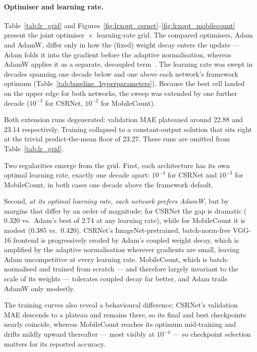 \documentclass[conference]{IEEEtran}
\begin{document}
\paragraph{Optimiser and learning rate.}
Table~\ref{tab:lr_grid} and
Figures~\ref{fig:lrxopt_csrnet}--\ref{fig:lrxopt_mobilecount} present
the joint optimiser~$\times$~learning-rate grid.
The compared optimisers, Adam and AdamW, differ only in how the
(fixed) weight decay enters the update — Adam folds it into the
gradient before the adaptive normalisation, whereas AdamW applies it
as a separate, decoupled term~\cite{loshchilov2019decoupled}.
The learning rate was swept in decades spanning one decade below and
one above each network's framework optimum
(Table~\ref{tab:baseline_hyperparameters}). Because the best cell
landed on the upper edge for both networks, the sweep was extended by
one further decade ($10^{-3}$ for CSRNet, $10^{-2}$ for MobileCount).

Both extension runs degenerated: validation MAE plateaued around 22.88 and 23.14 respectively. Training collapsed to a constant-output solution that sits right at the trivial predict-the-mean floor of 23.27. These runs are omitted from Table~\ref{tab:lr_grid}.

Two regularities emerge from the grid. First, each architecture has
its own optimal learning rate, exactly one decade apart: $10^{-4}$ for
CSRNet and $10^{-3}$ for MobileCount, in both cases one decade above
the framework default.

Second, \emph{at its optimal learning rate, each network prefers
AdamW}, but by margins that differ by an order of magnitude: for
CSRNet the gap is dramatic ($0.320$ vs.\ Adam's best of $2.74$ at any
learning rate), while for MobileCount it is modest ($0.385$ vs.\
$0.420$). CSRNet's ImageNet-pretrained, batch-norm-free VGG-16
frontend is progressively eroded by Adam's coupled weight decay, which is amplified by the adaptive normalisation
wherever gradients are small, leaving Adam uncompetitive at every
learning rate. MobileCount, which is batch-normalised and trained from
scratch — and therefore largely invariant to the scale of its weights
— tolerates coupled decay far better, and Adam trails AdamW only
modestly. 

The training curves also reveal a behavioural difference: CSRNet's
validation MAE descends to a plateau and remains there, so its final
and best checkpoints nearly coincide, whereas MobileCount reaches its
optimum mid-training and drifts mildly upward thereafter — most
visibly at $10^{-4}$ — so checkpoint selection matters for its
reported accuracy.%
\end{document}

